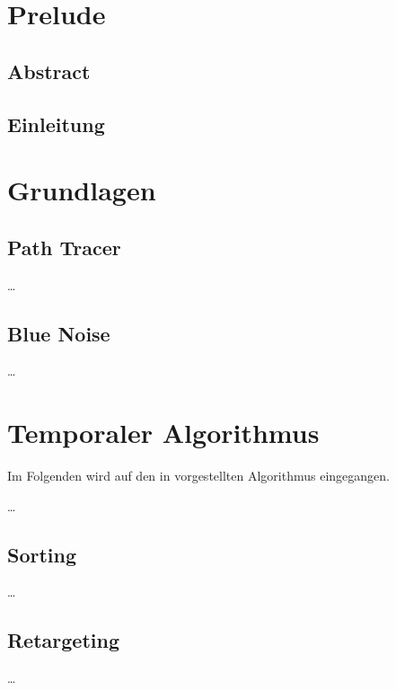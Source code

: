 
\chapter{Prelude}
\label{ch:Introduction}

\section{Abstract}

\section{Einleitung}


\chapter{Grundlagen}
\label{ch:Grundlagen}


\section{Path Tracer}
\label{ch:Content1:sec:PathTracer}


\dots


\section{Blue Noise}
\label{ch:Content1:sec:BlueNoise}


\dots



\chapter{Temporaler Algorithmus}
\label{ch:TemporalerAlgorithmus}
Im Folgenden wird auf den in \cite{hal-02158423} vorgestellten Algorithmus eingegangen.

\dots


\section{Sorting}
\label{ch:Content2:sec:Sorting}


\dots


\section{Retargeting}
\label{ch:Content2:sec:Retargeting}


\dots
